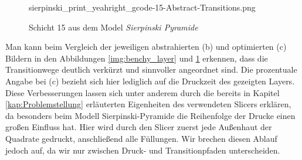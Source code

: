 \documentclass[12pt, a4paper]{article}
\begin{document}
\begin{samepage}
\begin{figure}[h!]
{    {sierpinski_print_yeahright_gcode-15-Abstract-Transitions.png}} 
\caption[Schicht 15 aus dem Model \textit{Sierpinski Pyramide}\newline Screenshot erstellt mit unserem PrintOptimizer]{Schicht 15 aus dem Model \textit{Sierpinski Pyramide}} 
\label{img:sierpinski_layer}
\end{figure} 
\end{samepage}

Man kann beim Vergleich der jeweiligen abstrahierten (b) und optimierten (c) Bildern in den Abbildungen \ref{img:benchy_layer} und \ref{img:sierpinski_layer} erkennen, dass die Transitionwege deutlich verkürzt und sinnvoller angeordnet sind. Die prozentuale Angabe bei (c) bezieht sich hier lediglich auf die Druckzeit des gezeigten Layers. Diese Verbesserungen lassen sich unter anderem durch die bereits in Kapitel \ref{kap:Problemstellung} erläuterten Eigenheiten des verwendeten Slicers erklären, da besonders beim Modell Sierpinski-Pyramide die Reihenfolge der Drucke einen großen Einfluss hat. Hier wird durch den Slicer zuerst jede Außenhaut der Quadrate gedruckt, anschließend alle Füllungen. Wir brechen diesen Ablauf jedoch auf, da wir nur zwischen Druck- und Transitionpfaden unterscheiden.


\newpage
\end{document}
